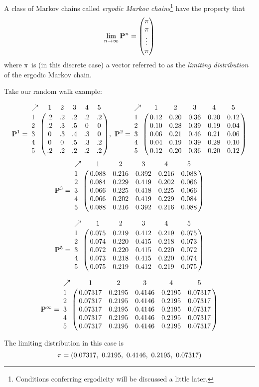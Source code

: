 A class of Markov chains called {\em ergodic Markov chains}\footnote{Conditions conferring ergodicity will be discussed a little later.} have the property that 
\[
	\lim_{n\rightarrow\infty} \mathbf{P}^n = \left(\begin{matrix}
	{\pi} \\
	{\pi} \\
	\vdots \\
	{\pi}
\end{matrix}
\right)
\]
where ${\pi}$ is (in this discrete case) a vector referred to as the {\em limiting distribution} of the ergodic Markov chain.

Take our random walk example:
{\small
	\[
		\mP^1 = \bordermatrix{
	\nearrow & 1 & 2 & 3 & 4 & 5 \cr
	1 & .2 & .2 & .2 & .2 & .2 \cr 
	2 & .2 & .3 & .5 & 0 & 0 \cr 
	3 & 0 & .3 & .4 & .3 & 0 \cr 
	4 & 0 & 0 & .5 & .3 & .2 \cr 
	5 & .2 & .2 & .2 & .2 & .2
	},~
	\mP^2 = \bordermatrix{
	\nearrow & 1 & 2 & 3 & 4 & 5 \cr
	1 & 0.12& 0.20& 0.36& 0.20& 0.12\cr 
	2 & 0.10& 0.28& 0.39& 0.19& 0.04\cr 
	3 & 0.06& 0.21& 
    0.46& 0.21& 0.06\cr
    4 &  0.04& 0.19& 0.39& 0.28& 0.10\cr 
    5 & 0.12& 0.20& 0.36& 0.20& 
    0.12
	}
	\]
	\[
	\mP^3 = \bordermatrix{
	\nearrow & 1 & 2 & 3 & 4 & 5 \cr
	1 & 0.088& 0.216& 0.392& 0.216& 0.088\cr 
	2 & 0.084& 0.229& 0.419& 0.202& 0.066\cr 
	3 & 0.066& 0.225& 0.418& 0.225& 0.066\cr 
	4 & 0.066& 0.202& 0.419& 0.229& 0.084\cr 
	5 & 0.088& 0.216& 0.392& 0.216& 0.088
	}
	\]
	
	\[
	\mP^5 = \bordermatrix{
	\nearrow & 1 & 2 & 3 & 4 & 5 \cr
	1 & 0.075 &  0.219 &  0.412 &  0.219 &  0.075 \cr
	2 & 0.074 &  0.220 &  0.415 & 0.218 &  0.073 \cr
	3 & 0.072 &  0.220 &  0.415 &  0.220 & 0.072 \cr
	4 & 0.073 &  0.218 &  0.415 &  0.220 &  0.074 \cr
	5 & 0.075 & 0.219 &  0.412 &  0.219 &  0.075 
	}
	\]
	
	\[
		\mP^\infty = \bordermatrix{
		\nearrow & 1 & 2 & 3 & 4 & 5 \cr
		1 & 0.07317 &  0.2195 &  0.4146 &  0.2195 &  0.07317 \cr  
		2&0.07317 &  0.2195 & 0.4146 &  0.2195 &  0.07317 \cr  
		3&0.07317 &  0.2195 &  0.4146 &  0.2195 & 0.07317 \cr  
		4&0.07317 &  0.2195 &  0.4146 &  0.2195 & 0.07317 \cr  
		5&0.07317 &  0.2195 &  0.4146 &  0.2195 &  0.07317
		}
	\]
}
\newpage
The limiting distribution in this case is
\[
	{\pi} = (0.07317,~0.2195,~0.4146,~0.2195,~0.07317)
\]
